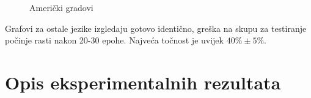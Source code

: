 \documentclass[conference]{IEEEtran}
\begin{document}
\begin{figure}[H]
\centering
{}
\caption{Američki gradovi}
\end{figure}
Grafovi za ostale jezike izgledaju gotovo identično, greška na skupu za testiranje počinje rasti nakon 20-30 epohe. Najveća točnost je uvijek $40\% \pm 5\%$.

\section{Opis eksperimentalnih rezultata} 
\end{document}
